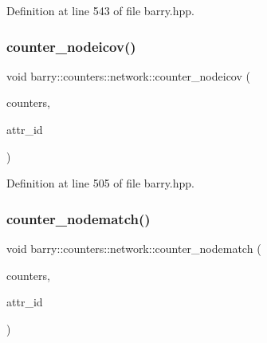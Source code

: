Definition at line 543 of file barry.\+hpp.

\mbox{\label{namespacebarry_1_1counters_1_1network_aef48e4ae85d30c2a949006faee2b5bae}} 
\subsubsection{\texorpdfstring{counter\+\_\+nodeicov()}{counter\_nodeicov()}}
{\footnotesize\ttfamily void barry\+::counters\+::network\+::counter\+\_\+nodeicov (\begin{DoxyParamCaption}\item[{\hyperlink{namespacebarry_1_1counters_1_1network_a3b3c590303d47840d1967372ae495d95}{Net\+Counter\+Vector} $\ast$}]{counters,  }\item[{\hyperlink{namespacebarry_a11dfc53ddb4672278319aa04f1e09a6c}{uint}}]{attr\+\_\+id }\end{DoxyParamCaption})\hspace{0.3cm}{\ttfamily [inline]}}



Definition at line 505 of file barry.\+hpp.

\mbox{\label{namespacebarry_1_1counters_1_1network_ab0a33b2990950574552ab909e6847f96}} 
\subsubsection{\texorpdfstring{counter\+\_\+nodematch()}{counter\_nodematch()}}
{\footnotesize\ttfamily void barry\+::counters\+::network\+::counter\+\_\+nodematch (\begin{DoxyParamCaption}\item[{\hyperlink{namespacebarry_1_1counters_1_1network_a3b3c590303d47840d1967372ae495d95}{Net\+Counter\+Vector} $\ast$}]{counters,  }\item[{\hyperlink{namespacebarry_a11dfc53ddb4672278319aa04f1e09a6c}{uint}}]{attr\+\_\+id }\end{DoxyParamCaption})\hspace{0.3cm}{\ttfamily [inline]}}



